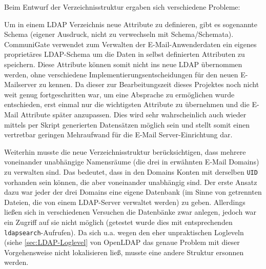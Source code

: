 \documentclass[11pt,a4paper,titlepage=firstiscover,headsepline,bibtotoc]{scrartcl} %
\begin{document}
\medskip Beim Entwurf der Verzeichnisstruktur ergaben sich verschiedene Probleme:

\noindent Um in einem LDAP Verzeichnis neue Attribute zu definieren, gibt es sogenannte Schema (eigener Ausdruck, nicht zu verwechseln mit Schema/Schemata). CommuniGate verwendet zum Verwalten der E-Mail-Anwenderdaten ein eigenes proprietäres LDAP-Schema um die Daten in selbst definierten Attributen zu speichern. Diese Attribute können somit nicht ins neue LDAP übernommen werden, ohne verschiedene Implementierungsentscheidungen für den neuen E-Mailserver zu kennen. Da dieser zur Bearbeitungszeit dieses Projektes noch nicht weit genug fortgeschritten war, um eine Absprache zu ermöglichen wurde entschieden, erst einmal nur die wichtigsten Attribute zu übernehmen und die E-Mail Attribute später anzupassen. Dies wird sehr wahrscheinlich auch wieder mittels per Skript generierten Datensätzen möglich sein und stellt somit einen vertretbar geringen Mehraufwand für die E-Mail Server-Einrichtung dar.

Weiterhin musste die neue Verzeichnisstruktur berücksichtigen, dass mehrere voneinander unabhängige Namensräume (die drei in  erwähnten E-Mail Domains) zu verwalten sind. Das bedeutet, dass in den Domains Konten mit derselben \texttt{UID} vorhanden sein können, die aber voneinander unabhängig sind. Der erste Ansatz dazu war jeder der drei Domains eine eigene Datenbank (im Sinne von getrennten Dateien, die von einem LDAP-Server verwaltet werden) zu geben. Allerdings ließen sich in verschiedenen Versuchen die Datenbänke zwar anlegen, jedoch war ein Zugriff auf sie nicht möglich (getestet wurde dies mit entsprechenden \texttt{ldapsearch}-Aufrufen). Da sich u.a. wegen den eher unpraktischen Logleveln (siehe \autoref{sec:LDAP-Loglevel} von OpenLDAP das genaue Problem mit dieser Vorgehensweise nicht lokalisieren ließ, musste eine andere Struktur ersonnen werden.
\end{document}
